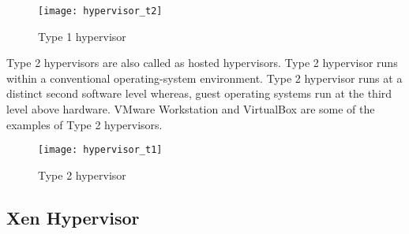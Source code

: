 \begin{figure}[!ht]
\centering
\texttt{[image: hypervisor\_t2]}
\caption{Type 1 hypervisor}
\label{Type 1 hypervisor}
\end{figure}
\begin{description}
\item Type 2 hypervisors are also called as hosted hypervisors. Type 2 hypervisor runs within a conventional operating-system environment. Type 2 hypervisor runs at a distinct second software level whereas, guest operating systems run at the third level above hardware. VMware Workstation and VirtualBox are some of the examples of Type 2 hypervisors\cite{Sugerman:2001:VID:647055.715774, citeulike:3149886}.
\end{description}
\begin{figure}[!ht]
\centering
\texttt{[image: hypervisor\_t1]}
\caption{Type 2 hypervisor}
\label{Type 2 hypervisor}
\end{figure}

\subsection{Xen Hypervisor}

